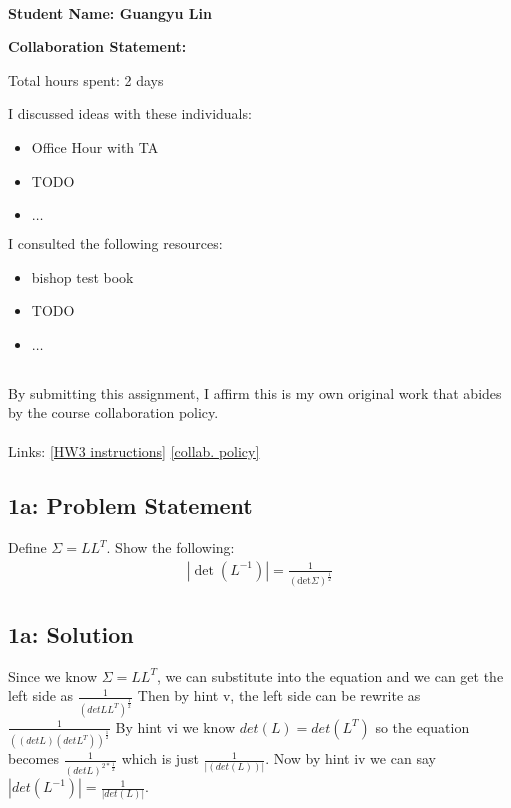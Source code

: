 \documentclass[10pt]{article}
\newcommand{\officialdirections}[1]{{\color{purple} #1}}
\begin{document}
~~\\ %

{\Large{\bf Student Name: Guangyu Lin}}

\Large{\bf Collaboration Statement:}

Total hours spent: 2 days

I discussed ideas with these individuals:
\begin{itemize}
\item Office Hour with TA
\item TODO
\item $\ldots$	
\end{itemize}

I consulted the following resources:
\begin{itemize}
\item bishop test book
\item TODO
\item $\ldots$	
\end{itemize}
~~\\
By submitting this assignment, I affirm this is my own original work that abides by the course collaboration policy.
~~\\
~~\\
Links: 
\href{https://www.cs.tufts.edu/cs/136/2023s/hw3.html}{[HW3 instructions]} 
\href{https://www.cs.tufts.edu/cs/136/2023s/index.html#collaboration}{[collab. policy]} 

\tableofcontents

\newpage

\officialdirections{
\subsection*{1a: Problem Statement}
Define $\Sigma = L L^T$. Show the following:
\begin{align}
| \det (L^{-1}) | = \frac{1}{(\text{det} \Sigma)^{\frac{1}{2}}}
\end{align}
}

\subsection{1a: Solution}
Since we know $\Sigma = L L^T$, we can substitute into the equation and we can get the left side as $\frac{1}{(detLL^T)^\frac{1}{2}}$
Then by hint v, the left side can be rewrite as $\frac{1}{((detL)(detL^T))^\frac{1}{2}}$ By hint vi we know $det (L) = det (L^T)$ so the equation becomes 
 $\frac{1}{(detL)^{2 * \frac{1}{2}}}$ which is just $\frac{1}{|(det(L))|}$. Now by hint iv we can say $|det(L^{-1})| = \frac{1}{|det(L)|}$.
\end{document}
